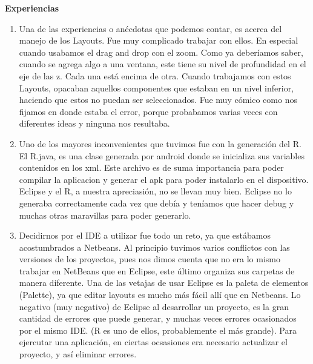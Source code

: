 \documentclass[12pt]{report}
\begin{document}
	\vspace{4em}
	
	\begingroup
		\large{
			\textbf{
				Experiencias
				\newline
				\newline
			}
		}
	\endgroup

		\begin{enumerate}[--]%
		\item Una de las experiencias o anécdotas que podemos contar, es acerca del manejo de los Layouts. Fue muy complicado trabajar con ellos. En especial cuando usabamos el drag and drop con el zoom. \newline
\newline Como ya deberíamos saber, cuando se agrega algo a una ventana, este tiene su nivel de profundidad en el eje de las z. Cada una está encima de otra. Cuando trabajamos con estos Layouts, opacaban aquellos componentes que estaban en un nivel inferior, haciendo que estos no puedan ser seleccionados. Fue muy cómico como nos fijamos en donde estaba el error, porque probabamos varias veces con diferentes ideas y ninguna nos resultaba. \newline
		\item Uno de los mayores inconvenientes que tuvimos fue con la generación del R. El R.java, es una clase generada por android donde se inicializa sus variables contenidos en los xml. Este archivo es de suma importancia para poder compilar la aplicacion y generar el apk para poder instalarlo en el dispositivo.\newline
\newline Eclipse y el R, a nuestra apreciasión, no se llevan muy bien. Eclipse no lo generaba correctamente cada vez que debía y teníamos que hacer debug y muchas otras maravillas para poder generarlo. \newline
		\item Decidirnos por el IDE a utilizar fue todo un reto, ya que estábamos acostumbrados a Netbeans. Al principio tuvimos varios conflictos con las versiones de los proyectos, pues nos dimos cuenta que no era lo mismo trabajar en NetBeans que en Eclipse, este último organiza sus carpetas de manera diferente. Una de las vetajas de usar Eclipse es la paleta de elementos (Palette), ya que editar layouts es mucho más fácil allí que en Netbeans. \newline
\newline Lo negativo (muy negativo) de Eclipse al desarrollar un proyecto, es la gran cantidad de errores que puede generar, y muchas veces errores ocasionados por el mismo IDE. (R es uno de ellos, probablemente el más grande). Para ejercutar una aplicación, en ciertas ocsasiones era necesario actualizar el proyecto, y así eliminar errores. \newline

\end{enumerate}
\end{document}
